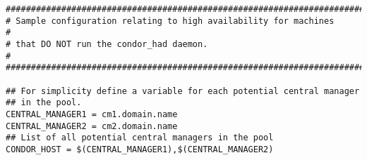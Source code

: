 \footnotesize
\begin{verbatim}
##########################################################################
# Sample configuration relating to high availability for machines        # 
# that DO NOT run the condor_had daemon.                                 #
##########################################################################

## For simplicity define a variable for each potential central manager
## in the pool. 
CENTRAL_MANAGER1 = cm1.domain.name
CENTRAL_MANAGER2 = cm2.domain.name
## List of all potential central managers in the pool
CONDOR_HOST = $(CENTRAL_MANAGER1),$(CENTRAL_MANAGER2)
\end{verbatim}
\normalsize


